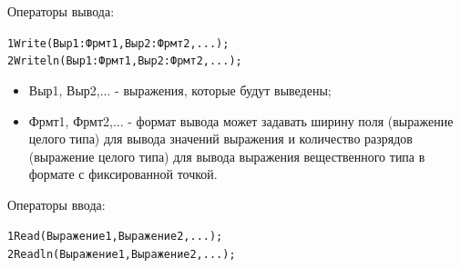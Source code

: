 \documentclass{beamer}
\begin{document}
\begin{frame}[fragile]
Операторы вывода:
\begin{alltt}
1  Write(Выр1:Фрмт1, Выр2:Фрмт2,...);
2  Writeln(Выр1:Фрмт1, Выр2:Фрмт2,...);
\end{alltt}
\begin{itemize}
\item Выр1, Выр2,... - выражения, которые будут выведены;
\item Фрмт1, Фрмт2,...  - формат вывода может задавать ширину поля (выражение целого типа) для вывода значений выражения и количество разрядов (выражение целого типа) для вывода выражения вещественного типа в формате с фиксированной точкой.
\end{itemize}
Операторы ввода:
\begin{alltt}
1  Read(Выражение1, Выражение2, ...);
2  Readln(Выражение1, Выражение2, ...);
\end{alltt}
\end{frame}
\end{document}
